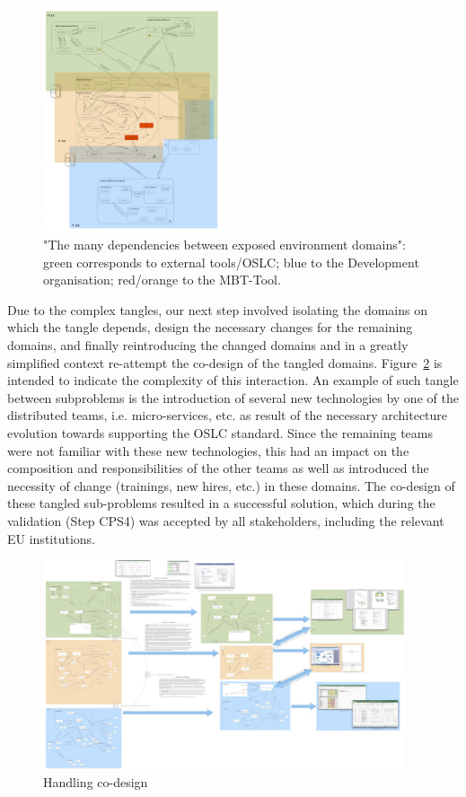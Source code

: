 \documentclass[runningheads,a4paper]{llncs}
\begin{document}
\begin{figure}[htbp]
	\centering
	\includegraphics[width=0.47\textwidth]{pics/tangles.png}
	\caption{"The many dependencies between exposed environment domains": green corresponds to external tools/OSLC; blue to the Development organisation; red/orange to the MBT-Tool.}
	\label{fig:tangles}
\end{figure}

Due to the complex tangles, our next step involved isolating the domains on which the tangle depends, design the necessary changes for the remaining domains, and finally reintroducing the changed domains and in a greatly simplified context re-attempt the co-design of the tangled domains. Figure~\ref{fig:pprog} is intended to indicate the complexity of this interaction. An example of such tangle between subproblems is the introduction of several new technologies by one of the distributed teams, i.e. micro-services, etc. as result of the necessary architecture evolution towards supporting the OSLC standard. Since the remaining teams were not familiar with these new technologies, this had an impact on the composition and responsibilities of the other teams as well as introduced the necessity of change (trainings, new hires, etc.) in these domains. 
The co-design of these tangled sub-problems resulted in a successful solution, which during the validation (Step CPS4) was accepted by all stakeholders, including the relevant EU institutions. 

\begin{figure}[htbp]
	\centering
	\includegraphics[width=0.95\textwidth]{pics/pprogression.jpg}
	\caption{Handling co-design}
	\label{fig:pprog}
\end{figure}
\end{document}
